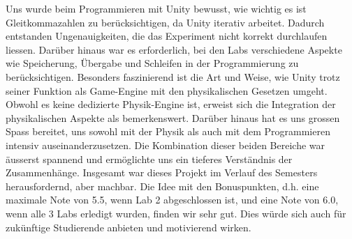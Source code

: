 \documentclass[../main.tex]{subfiles}
\begin{document}
    \newline
    Uns wurde beim Programmieren mit Unity bewusst, wie wichtig es ist Gleitkommazahlen zu berücksichtigen,
    da Unity iterativ arbeitet. Dadurch entstanden Ungenauigkeiten, die das Experiment nicht korrekt durchlaufen
    liessen. Darüber hinaus war es erforderlich, bei den Labs verschiedene Aspekte wie Speicherung, Übergabe und
    Schleifen in der Programmierung zu berücksichtigen.
    \newline
    Besonders faszinierend ist die Art und Weise, wie Unity trotz seiner Funktion als Game-Engine mit den
    physikalischen Gesetzen umgeht. Obwohl es keine dedizierte Physik-Engine ist, erweist sich die Integration
    der physikalischen Aspekte als bemerkenswert.
    \newline
    Darüber hinaus hat es uns grossen Spass bereitet, uns sowohl mit der Physik als auch mit dem Programmieren
    intensiv auseinanderzusetzen. Die Kombination dieser beiden Bereiche war äusserst spannend und ermöglichte
    uns ein tieferes Verständnis der Zusammenhänge.
    \newline
    Insgesamt war dieses Projekt im Verlauf des Semesters herausfordernd, aber machbar. Die Idee mit den
    Bonuspunkten, d.h. eine maximale Note von 5.5, wenn Lab 2 abgeschlossen ist, und eine Note von 6.0,
    wenn alle 3 Labs erledigt wurden, finden wir sehr gut. Dies würde sich auch für zukünftige Studierende
    anbieten und motivierend wirken.
\end{document}
